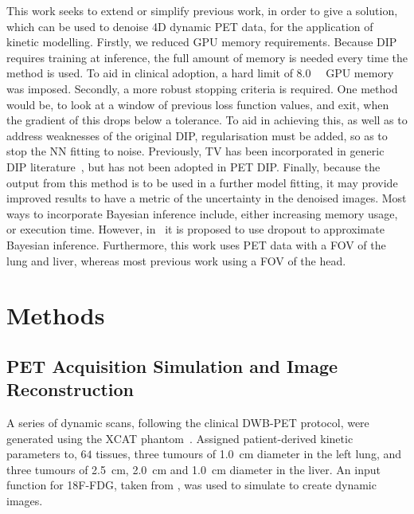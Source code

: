     This work seeks to extend or simplify previous work, in order to give a solution, which can be used to denoise \gls{4D} dynamic \gls{PET} data, for the application of kinetic modelling. Firstly, we reduced \gls{GPU} memory requirements. Because \gls{DIP} requires training at inference, the full amount of memory is needed every time the method is used. To aid in clinical adoption, a hard limit of \SI{8.0}{\giga\byte} \gls{GPU} memory was imposed. Secondly, a more robust stopping criteria is required.%
    One method would be, to look at a window of previous loss function values, and exit, when the gradient of this drops below a tolerance. To aid in achieving this, as well as to address weaknesses of the original \gls{DIP}, regularisation must be added, so as to stop the \gls{NN} fitting to noise. Previously, \gls{TV} has been incorporated in generic \gls{DIP} literature~\cite{Liu2019ImagePrior}, but has not been adopted in \gls{PET} \gls{DIP}. Finally, because the output from this method is to be used in a further model fitting, it may provide improved results to have a metric of the uncertainty in the denoised images. Most ways to incorporate Bayesian inference include, either increasing memory usage, or execution time. However, in~\cite{Gal2015DropoutLearning} it is proposed to use dropout to approximate Bayesian inference. Furthermore, this work uses \gls{PET} data with a \gls{FOV} of the lung and liver, whereas most previous work using a \gls{FOV} of the head.


\section{Methods} \label{sec:methods}
    \subsection{\gls{PET} Acquisition Simulation and Image Reconstruction} \label{sec:pet_acquisition_simulation_and_image_reconstruction}
        A series of dynamic scans, following the clinical \gls{DWB}-\gls{PET} protocol, were generated using the \gls{XCAT} phantom~\cite{segars4DXCATPhantom2010}. Assigned patient-derived kinetic parameters to, $64$ tissues, three tumours of \SI{1.0}{\centi\meter} diameter in the left lung, and three tumours of \SI{2.5}{\centi\meter}, \SI{2.0}{\centi\meter} and \SI{1.0}{\centi\meter} diameter in the liver. An input function for \gls{18F-FDG}, taken from \cite{langsjoEffectsSubanestheticKetamine2004}, was used to simulate  to create dynamic images.

